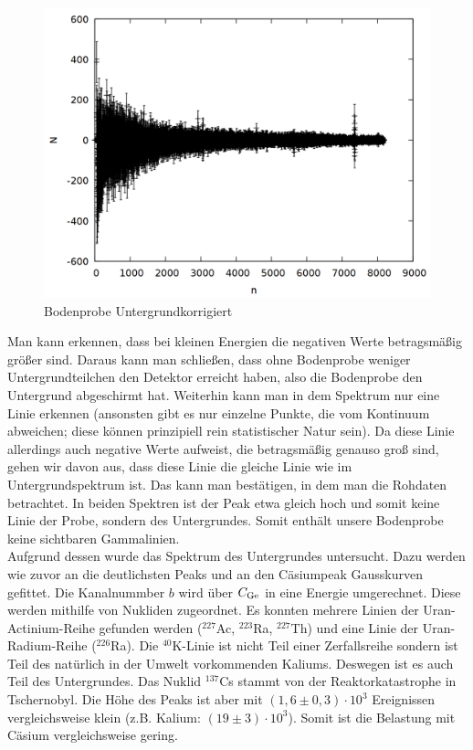 \begin{figure}
\centering
\includegraphics[width=0.7\linewidth]{data/erde.png}
\caption{Bodenprobe Untergrundkorrigiert}
\label{fig:erde}
\end{figure}

Man kann erkennen, dass bei kleinen Energien die negativen Werte betragsmäßig größer sind. Daraus kann man schließen, dass ohne Bodenprobe weniger Untergrundteilchen den Detektor erreicht haben, also die Bodenprobe den Untergrund abgeschirmt hat. Weiterhin kann man in dem Spektrum nur eine Linie erkennen (ansonsten gibt es nur einzelne Punkte, die vom Kontinuum abweichen; diese können prinzipiell rein statistischer Natur sein). Da diese Linie allerdings auch negative Werte aufweist, die betragsmäßig genauso groß sind, gehen wir davon aus, dass diese Linie die gleiche Linie wie im Untergrundspektrum ist. Das kann man bestätigen, in dem man die Rohdaten betrachtet. In beiden Spektren ist der Peak etwa gleich hoch und somit keine Linie der Probe, sondern des Untergrundes. Somit enthält unsere Bodenprobe keine sichtbaren Gammalinien.\\

Aufgrund dessen wurde das Spektrum des Untergrundes untersucht. Dazu werden wie zuvor an die deutlichsten Peaks und an den Cäsiumpeak Gausskurven gefittet. Die Kanalnummber $b$ wird über $C_\mathrm{Ge}$ in eine Energie umgerechnet. Diese werden mithilfe von \cite{lara} Nukliden zugeordnet. Es konnten mehrere Linien der Uran-Actinium-Reihe gefunden werden ($^{227}$Ac, $^{223}$Ra, $^{227}$Th) und eine Linie der Uran-Radium-Reihe ($^{226}$Ra). Die $^{40}$K-Linie ist nicht Teil einer Zerfallsreihe sondern ist Teil des natürlich in der Umwelt vorkommenden Kaliums. Deswegen ist es auch Teil des Untergrundes. Das Nuklid $^{137}$Cs stammt von der Reaktorkatastrophe in Tschernobyl. Die Höhe des Peaks ist aber mit $(1,6 \pm 0,3) \cdot 10^3$ Ereignissen vergleichsweise klein (z.B. Kalium: $(19 \pm 3)\cdot 10^3$). Somit ist die Belastung mit Cäsium vergleichsweise gering.

